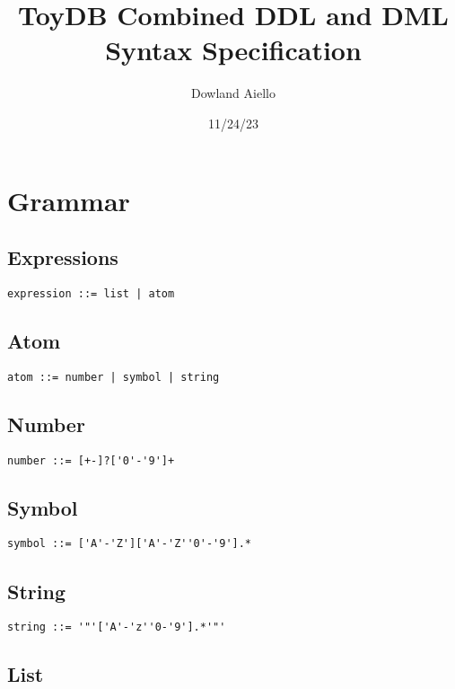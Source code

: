 \documentclass[11pt]{article}
\author{Dowland Aiello}
\date{11/24/23}
\title{ToyDB Combined DDL and DML Syntax Specification}
\begin{document}
\maketitle
\tableofcontents


\section{Grammar}
\label{sec:orgb6f56cc}
\subsection{Expressions}
\label{sec:org84e0d0f}

\begin{verbatim}
expression ::= list | atom
\end{verbatim}

\subsection{Atom}
\label{sec:org0f59864}

\begin{verbatim}
atom ::= number | symbol | string
\end{verbatim}

\subsection{Number}
\label{sec:orgae9f59b}

\begin{verbatim}
number ::= [+-]?['0'-'9']+
\end{verbatim}

\subsection{Symbol}
\label{sec:org1f8b2f9}

\begin{verbatim}
symbol ::= ['A'-'Z']['A'-'Z''0'-'9'].*
\end{verbatim}

\subsection{String}
\label{sec:org829a99f}

\begin{verbatim}
string ::= '"'['A'-'z''0-'9'].*'"'
\end{verbatim}

\subsection{List}
\label{sec:org789128f}
\end{document}

